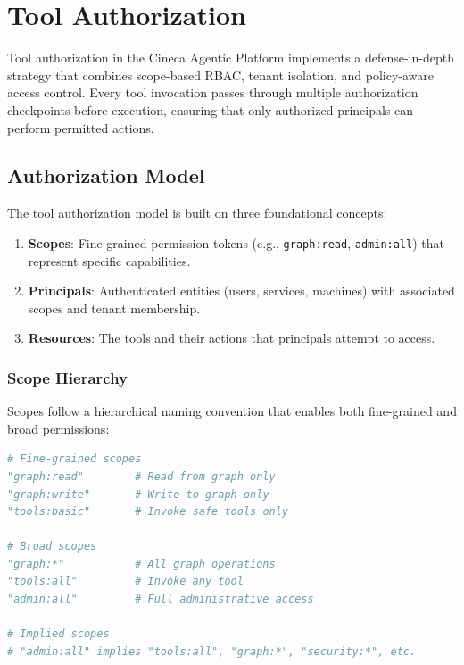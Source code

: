 
\section{Tool Authorization}
\label{sec:tool-authorization}

Tool authorization in the Cineca Agentic Platform implements a defense-in-depth strategy that combines scope-based RBAC, tenant isolation, and policy-aware access control. Every tool invocation passes through multiple authorization checkpoints before execution, ensuring that only authorized principals can perform permitted actions.

\subsection{Authorization Model}
\label{subsec:authorization-model}

The tool authorization model is built on three foundational concepts:

\begin{enumerate}
    \item \textbf{Scopes}: Fine-grained permission tokens (e.g., \texttt{graph:read}, \texttt{admin:all}) that represent specific capabilities.
    \item \textbf{Principals}: Authenticated entities (users, services, machines) with associated scopes and tenant membership.
    \item \textbf{Resources}: The tools and their actions that principals attempt to access.
\end{enumerate}

\subsubsection{Scope Hierarchy}

Scopes follow a hierarchical naming convention that enables both fine-grained and broad permissions:

\begin{lstlisting}[language=Python, caption={Scope hierarchy examples}, label={lst:scope-hierarchy}]
# Fine-grained scopes
"graph:read"        # Read from graph only
"graph:write"       # Write to graph only
"tools:basic"       # Invoke safe tools only

# Broad scopes
"graph:*"           # All graph operations
"tools:all"         # Invoke any tool
"admin:all"         # Full administrative access

# Implied scopes
# "admin:all" implies "tools:all", "graph:*", "security:*", etc.
\end{lstlisting}


